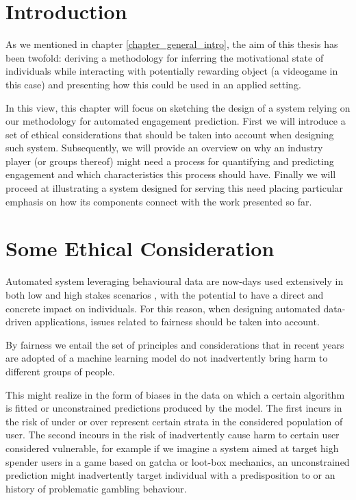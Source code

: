 \section{Introduction}
\label{industry_needs}
As we mentioned in chapter \ref{chapter_general_intro}, the aim of this thesis has been twofold: deriving a methodology for inferring the motivational state of individuals while interacting with potentially rewarding object (a videogame in this case) and presenting how this could be used in an applied setting.

In this view, this chapter will focus on sketching the design of a system relying on our methodology for automated engagement prediction. First we will introduce a set of ethical considerations that should be taken into account when designing such system. Subsequently, we will provide an overview on why an industry player (or groups thereof) might need a process for quantifying and predicting engagement and which characteristics this process should have. Finally we will proceed at illustrating a system designed for serving this need placing particular emphasis on how its components connect with the work presented so far.

\section{Some Ethical Consideration}
\label{ehtical_considerations}
Automated system leveraging behavioural data are now-days used extensively in both low and high stakes scenarios \cite{mehrabi2021survey}, with the potential to have a direct and concrete impact on individuals. For this reason, when designing automated data-driven applications, issues related to fairness should be taken into account. 

By fairness we entail the set of principles and considerations that in recent years are adopted  of a machine learning model do not inadvertently bring harm to different groups of people. 

This might realize in the form of biases in the data on which a certain algorithm is fitted or unconstrained predictions produced by the model. The first incurs in the risk of  under or over represent certain strata in the considered population of user. The second incours in the risk of inadvertently cause harm to certain user considered vulnerable, for example if we imagine a system aimed at target high spender users in a game based on gatcha or loot-box mechanics, an unconstrained prediction might inadvertently target individual with a predisposition to or an history of problematic gambling behaviour.

